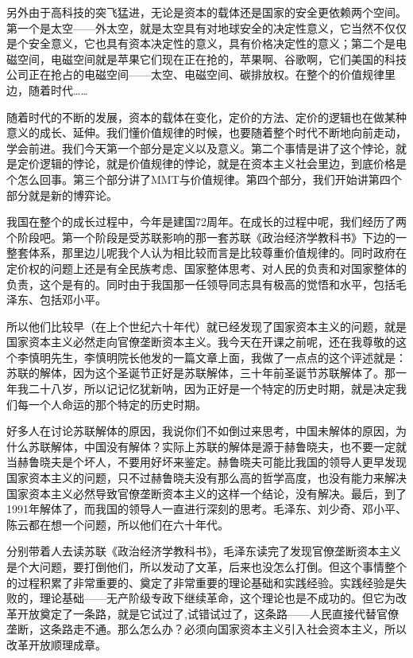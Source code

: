 \documentclass[UTF8, 12pt, a4paper]{ctexrep}
\begin{document}
另外由于高科技的突飞猛进，无论是资本的载体还是国家的安全更依赖两个空间。第一个是太空——外太空，就是太空具有对地球安全的决定性意义，它当然不仅仅是个安全意义，它也具有资本决定性的意义，具有价格决定性的意义；第二个是电磁空间，电磁空间就是苹果它们现在正在抢的，苹果啊、谷歌啊，它们美国的科技公司正在抢占的电磁空间——太空、电磁空间、碳排放权。在整个的价值规律里边，随着时代……

随着时代的不断的发展，资本的载体在变化，定价的方法、定价的逻辑也在做某种意义的成长、延伸。我们懂价值规律的时候，也要随着整个时代不断地向前走动，学会前进。我们今天第一个部分是定义以及意义。第二个事情是讲了这个悖论，就是定价逻辑的悖论，就是价值规律的悖论，就是在资本主义社会里边，到底价格是个怎么回事。第三个部分讲了MMT与价值规律。第四个部分，我们开始讲第四个部分就是新的博弈论。

我国在整个的成长过程中，今年是建国72周年。在成长的过程中呢，我们经历了两个阶段吧。第一个阶段是受苏联影响的那一套苏联《政治经济学教科书》下边的一整套体系，那里边儿呢我个人认为相比较而言是比较尊重价值规律的。同时政府在定价权的问题上还是有全民族考虑、国家整体思考、对人民的负责和对国家整体的负责，这个是有的。同时由于我国那一任领导同志具有极高的觉悟和水平，包括毛泽东、包括邓小平。

所以他们比较早（在上个世纪六十年代）就已经发现了国家资本主义的问题，就是国家资本主义必然走向官僚垄断资本主义。我今天在开课之前呢，还在我尊敬的这个李慎明先生，李慎明院长他发的一篇文章上面，我做了一点点的这个评述就是：苏联的解体，因为这个圣诞节正好是苏联解体，三十年前圣诞节苏联解体了。那一年我二十八岁，所以记记忆犹新呐，因为正好是一个特定的历史时期，就是决定我们每一个人命运的那个特定的历史时期。

好多人在讨论苏联解体的原因，我说你们不如倒过来思考，中国未解体的原因，为什么苏联解体，中国没有解体？实际上苏联的解体是源于赫鲁晓夫，也不要一定就当赫鲁晓夫是个坏人，不要用好坏来鉴定。赫鲁晓夫可能比我国的领导人更早发现国家资本主义的问题，只不过赫鲁晓夫没有那么高的哲学高度，也没有能力来解决国家资本主义必然导致官僚垄断资本主义的这样一个结论，没有解决。最后，到了1991年解体了，而我国的领导人一直进行深刻的思考。毛泽东、刘少奇、邓小平、陈云都在想一个问题，所以他们在六十年代。

分别带着人去读苏联《政治经济学教科书》，毛泽东读完了发现官僚垄断资本主义是个大问题，要打倒他们，所以发动了文革，后来也没怎么打倒。但这个事情整个的过程积累了非常重要的、奠定了非常重要的理论基础和实践经验。实践经验是失败的，理论基础——无产阶级专政下继续革命，这个理论也是不成功的。但它为改革开放奠定了一条路，就是它试过了,试错试过了，这条路——人民直接代替官僚垄断，这条路走不通。那么怎么办？必须向国家资本主义引入社会资本主义，所以改革开放顺理成章。
\end{document}
